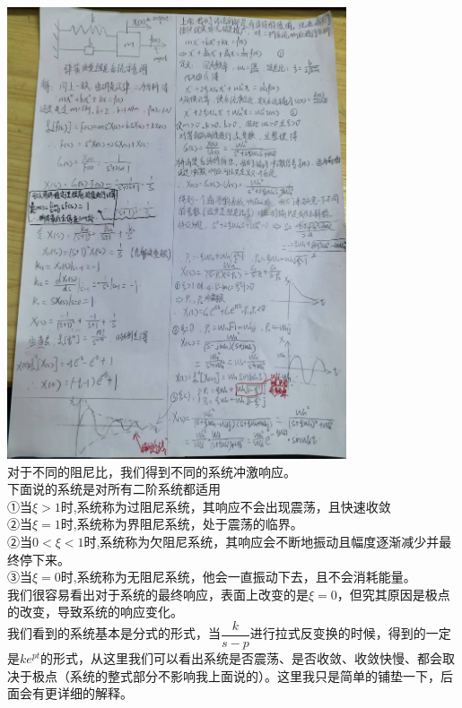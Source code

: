 \documentclass[UTF8,a4paper,12pt]{ctexart}
\begin{document}
    \begin{notitlebox}
          \par \includegraphics[width=10cm]{picture/transform formula.png}
   \\ 对于不同的阻尼比，我们得到不同的系统冲激响应。
   \\{\scriptsize 下面说的系统是对所有二阶系统都适用}
    \\①当$\xi>1$时,系统称为过阻尼系统，其响应不会出现震荡，且快速收敛
    \\②当$\xi=1$时,系统称为界阻尼系统，处于震荡的临界。
    \\②当$0<\xi<1$时,系统称为欠阻尼系统，其响应会不断地振动且幅度逐渐减少并最终停下来。
    \\③当$\xi=0$时,系统称为无阻尼系统，他会一直振动下去，且不会消耗能量。
    \\我们很容易看出对于系统的最终响应，表面上改变的是$\xi=0$，但究其原因是极点的改变，导致系统的响应变化。
    \\我们看到的系统基本是分式的形式，当$\dfrac{k}{s-p}$进行拉式反变换的时候，得到的一定是$ke^{pt}$的形式，从这里我们可以看出系统是否震荡、是否收敛、收敛快慢、都会取决于极点（系统的整式部分不影响我上面说的）。这里我只是简单的铺垫一下，后面会有更详细的解释。
    \end{notitlebox}
    
\end{document}
